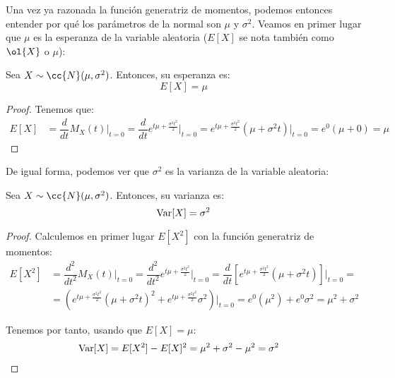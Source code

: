 Una vez ya razonada la función generatriz de momentos, podemos entonces entender por qué los parámetros de la normal son $\mu$ y $\sigma^2$.
Veamos en primer lugar que $\mu$ es la esperanza de la variable aleatoria ($E[X]$ se nota también como $\ol{X}$ o $\mu$):
\begin{prop}
    Sea $X\sim \cc{N}(\mu,\sigma^2)$. Entonces, su esperanza es:
    \begin{equation*}
        E[X] = \mu
    \end{equation*}
\end{prop}
\begin{proof}
    Tenemos que:
    \begin{align*}
        E[X] &= \dfrac{d}{dt} M_X(t) \Big|_{t=0} = \dfrac{d}{dt} e^{t\mu + \frac{\sigma^2 t^2}{2}} \Big|_{t=0}
        = e^{t\mu + \frac{\sigma^2 t^2}{2}}\left(\mu + \sigma^2 t\right) \Big|_{t=0} = e^{0}(\mu + 0) = \mu
    \end{align*}
\end{proof}

De igual forma, podemos ver que $\sigma^2$ es la varianza de la variable aleatoria:
\begin{prop}
    Sea $X\sim \cc{N}(\mu,\sigma^2)$. Entonces, su varianza es:
    \begin{equation*}
        \operatorname{Var}[X] = \sigma^2
    \end{equation*}
\end{prop}
\begin{proof}
    Calculemos en primer lugar $E[X^2]$ con la función generatriz de momentos:
    \begin{align*}
        E[X^2] &= \dfrac{d^2}{dt^2} M_X(t) \Big|_{t=0} = \dfrac{d^2}{dt^2} e^{t\mu + \frac{\sigma^2 t^2}{2}} \Big|_{t=0}
        = \dfrac{d}{dt} \left[e^{t\mu + \frac{\sigma^2 t^2}{2}}(\mu + \sigma^2 t)\right] \Big|_{t=0} =\\
        &= \left(e^{t\mu + \frac{\sigma^2 t^2}{2}}\left(\mu + \sigma^2 t\right)^2 + e^{t\mu + \frac{\sigma^2 t^2}{2}}\sigma^2\right) \Big|_{t=0}
        = e^{0}(\mu^2) + e^{0}\sigma^2 = \mu^2 + \sigma^2
    \end{align*}

    Tenemos por tanto, usando que $E[X] = \mu$:
    \begin{align*}
        \operatorname{Var}[X] &= E[X^2] - E[X]^2 = \mu^2 + \sigma^2 - \mu^2 = \sigma^2
    \end{align*}
\end{proof}


